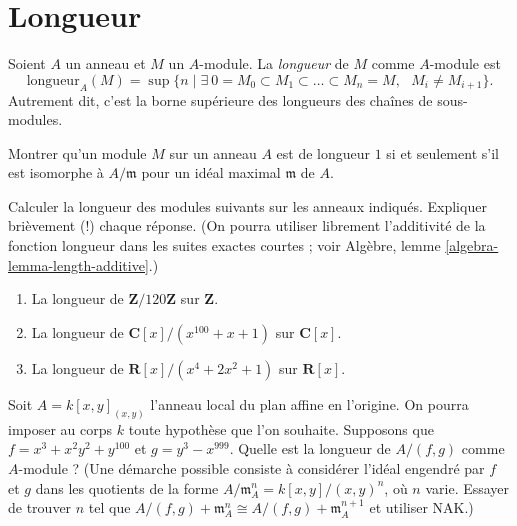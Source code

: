 \section{Longueur}
\label{section-length}

\begin{definition}
\label{definition-length}
Soient $A$ un anneau et $M$ un $A$-module. La
{\it longueur} de $M$ comme $A$-module est
$$
\text{longueur}_A(M)
=
\sup
\{
n
\mid
\exists\ 0 = M_0 \subset M_1 \subset \ldots \subset M_n = M,
\text{ }M_i \not = M_{i + 1}
\}.
$$
Autrement dit, c'est la borne supérieure des longueurs des chaînes de sous-modules.
\end{definition}

\begin{exercise}
\label{exercise-length-is-one}
Montrer qu'un module $M$ sur un anneau $A$ est de longueur $1$ si et seulement s'il
est isomorphe à $A/\mathfrak m$ pour un idéal maximal $\mathfrak m$
de $A$.
\end{exercise}

\begin{exercise}
\label{exercise-length-easy}
Calculer la longueur des modules suivants sur les anneaux indiqués.
Expliquer brièvement (!) chaque réponse. (On pourra utiliser librement l'additivité de
la fonction longueur dans les suites exactes courtes ; voir
Algèbre, lemme \ref{algebra-lemma-length-additive}.)
\begin{enumerate}
\item La longueur de $\mathbf{Z}/120\mathbf{Z}$ sur $\mathbf{Z}$.
\item La longueur de $\mathbf{C}[x]/(x^{100} + x + 1)$ sur $\mathbf{C}[x]$.
\item La longueur de $\mathbf{R}[x]/(x^4 + 2x^2 + 1)$ sur $\mathbf{R}[x]$.
\end{enumerate}
\end{exercise}

\begin{exercise}
\label{exercise-compute-length}
Soit $A = k[x, y]_{(x, y)}$ l'anneau local du plan affine en
l'origine. On pourra imposer au corps $k$ toute hypothèse que l'on souhaite. Supposons
que $f = x^3 + x^2y^2 + y^{100}$ et $g = y^3 - x^{999}$. Quelle est la longueur
de $A/(f, g)$ comme $A$-module ? (Une démarche possible consiste à considérer
l'idéal engendré par $f$ et $g$ dans les quotients de la forme $A/{\mathfrak m}_A^n=
k[x, y]/(x, y)^n$, où $n$ varie. Essayer de trouver $n$ tel que
$A/(f, g)+{\mathfrak m}_A^n \cong A/(f, g)+{\mathfrak m}_A^{n + 1}$
et utiliser NAK.)
\end{exercise}






